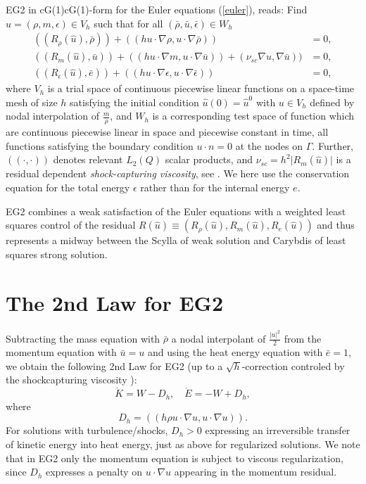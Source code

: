 EG2 in cG(1)cG(1)-form for the Euler equations (\ref{euler}), reads: 
Find $\hat u =(\rho ,m,\epsilon )\in V_h$ such that for all 
$(\bar\rho ,\bar u,\bar\epsilon )\in W_h$
\begin{equation}
\begin{split}
((R_\rho (\hat u),\bar\rho ))+((h u\cdot\nabla\rho , 
u\cdot\nabla\bar\rho ))&=0,\\
((R_m(\hat u),\bar u))+
((h u\cdot\nabla m, u\cdot\nabla\bar u))+(\nu_{sc}\nabla u,\nabla\bar u))&=0,\\
((R_\epsilon (\hat u),\bar e))+
((h u\cdot\nabla \epsilon ,u\cdot\nabla\bar\epsilon ))&=0,
\end{split}
\end{equation}
where $V_h$ is a trial space of continuous piecewise linear 
functions on a space-time mesh of size $h$ satisfying the initial
condition $\hat u(0)=\hat u^0$ with $u\in V_h$ defined by
nodal interpolation of $\frac{m}{\rho}$, and $W_h$ 
is a corresponding test space of function which are
continuous piecewise linear in space and piecewise constant in time,
all functions satisfying the boundary condition $u\cdot n=0$ at the 
nodes on
$\Gamma$. Further, $((\cdot ,\cdot ))$  
denotes relevant  
$L_2(Q)$ scalar products, and $\nu_{sc}=h^2\vert R_m(\hat u)\vert$ is
a residual dependent \emph{shock-capturing viscosity}, see \cite{ambsthermo}.  We here use the conservation equation
for the total energy $\epsilon$ rather than for the internal energy
$e$.

EG2 combines a weak satisfaction of the Euler equations
with a weighted least squares control of the residual $R(\hat u)
\equiv (R_\rho (\hat u) ,R_m(\hat u),R_e(\hat u))$ and
thus represents a midway between the Scylla of weak solution and
Carybdis of least squares strong solution. 



\section{The 2nd Law for EG2}

Subtracting the mass equation with 
$\bar\rho$ a nodal interpolant 
of $\frac{\vert u\vert^2}{2}$ 
from the momentum equation
with  $\bar u=u$ and using the heat energy equation with $\bar e=1$, we obtain
the following 2nd Law for EG2 (up to a $\sqrt{h}$-correction controled
by the shockcapturing viscosity \cite{johnsonconslaw}): 
\begin{equation}\label{2ndlawEG2}
\dot K = W-D_h,\quad \dot E=-W+D_h,
\end{equation}
where 
\begin{equation}
D_h=((h\rho u\cdot\nabla u,u\cdot\nabla u)).
\end{equation}
For solutions with turbulence/shocks, $D_h>0$ expressing an irreversible
transfer of kinetic energy into heat energy, just as above for regularized
solutions. We note that in EG2 only the momentum equation is
subject to viscous regularization, since $D_h$ expresses a 
penalty on $u\cdot\nabla u$ appearing in the momentum residual.  


